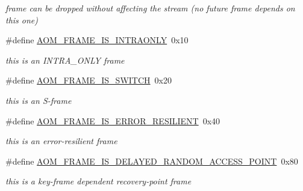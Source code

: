 \begin{DoxyCompactItemize}
\begin{DoxyCompactList}\small\item\em frame can be dropped without affecting the stream (no future frame depends on this one) \end{DoxyCompactList}\item 
\mbox{\label{group__encoder_ga5ffee67363a67d56654926d49e98b7d4}} 
\#define \hyperlink{group__encoder_ga5ffee67363a67d56654926d49e98b7d4}{A\+O\+M\+\_\+\+F\+R\+A\+M\+E\+\_\+\+I\+S\+\_\+\+I\+N\+T\+R\+A\+O\+N\+LY}~0x10
\begin{DoxyCompactList}\small\item\em this is an I\+N\+T\+R\+A\+\_\+\+O\+N\+LY frame \end{DoxyCompactList}\item 
\mbox{\label{group__encoder_gadcd30e5b2e9f025d38c733d90c0b651c}} 
\#define \hyperlink{group__encoder_gadcd30e5b2e9f025d38c733d90c0b651c}{A\+O\+M\+\_\+\+F\+R\+A\+M\+E\+\_\+\+I\+S\+\_\+\+S\+W\+I\+T\+CH}~0x20
\begin{DoxyCompactList}\small\item\em this is an S-\/frame \end{DoxyCompactList}\item 
\mbox{\label{group__encoder_ga38c20192519a602646b9121c66dc0e70}} 
\#define \hyperlink{group__encoder_ga38c20192519a602646b9121c66dc0e70}{A\+O\+M\+\_\+\+F\+R\+A\+M\+E\+\_\+\+I\+S\+\_\+\+E\+R\+R\+O\+R\+\_\+\+R\+E\+S\+I\+L\+I\+E\+NT}~0x40
\begin{DoxyCompactList}\small\item\em this is an error-\/resilient frame \end{DoxyCompactList}\item 
\mbox{\label{group__encoder_ga42450a4820d734d42acd9fa99dcf5768}} 
\#define \hyperlink{group__encoder_ga42450a4820d734d42acd9fa99dcf5768}{A\+O\+M\+\_\+\+F\+R\+A\+M\+E\+\_\+\+I\+S\+\_\+\+D\+E\+L\+A\+Y\+E\+D\+\_\+\+R\+A\+N\+D\+O\+M\+\_\+\+A\+C\+C\+E\+S\+S\+\_\+\+P\+O\+I\+NT}~0x80
\begin{DoxyCompactList}\small\item\em this is a key-\/frame dependent recovery-\/point frame \end{DoxyCompactList}\item 
\mbox{\label{group__encoder_ga4118658e1fc1590f72fec38478ae230d}} 

\end{DoxyCompactItemize}
